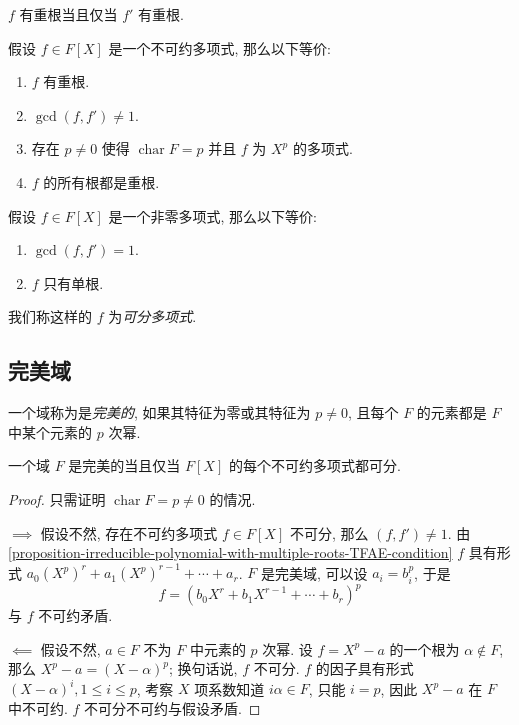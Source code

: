 \begin{lemma}
  \( f \) 有重根当且仅当 \( f' \) 有重根.
\end{lemma}

\begin{proposition}
  \label{proposition-irreducible-polynomial-with-multiple-roots-TFAE-condition}
  假设 \( f \in F[X] \) 是一个不可约多项式, 那么以下等价:
  \begin{enumerate}
    \item \( f \) 有重根.
    \item \( \gcd(f, f') \neq 1 \).
    \item 存在 \( p \neq 0 \) 使得 \( \operatorname{char} F = p \) 并且 \( f \)
      为 \( X^p \) 的多项式.
    \item \( f \) 的所有根都是重根.
  \end{enumerate}
\end{proposition}

\begin{proposition}
  假设 \( f \in F[X] \) 是一个非零多项式, 那么以下等价:
  \begin{enumerate}
    \item \( \gcd(f, f') = 1 \).
    \item \( f \) 只有单根.
  \end{enumerate}
  我们称这样的 \( f \) 为\emph{可分多项式}.
\end{proposition}

\subsection{完美域}

一个域称为是\emph{完美的}, 如果其特征为零或其特征为 \( p \neq 0 \), 且每个 \( F
\) 的元素都是 \( F \) 中某个元素的 \( p \) 次幂.

\begin{proposition}
  一个域 \( F \) 是完美的当且仅当 \( F[X] \) 的每个不可约多项式都可分.
\end{proposition}
\begin{proof}
  只需证明 \( \operatorname{char} F = p \neq 0 \) 的情况.

  \( \implies \) 假设不然, 存在不可约多项式 \( f \in F[X] \) 不可分, 那么 \( (f,
  f') \neq 1 \).
  由\cref{proposition-irreducible-polynomial-with-multiple-roots-TFAE-condition}
  \( f \) 具有形式 \( a_0(X^p)^r + a_{1}(X^p)^{r - 1} + \cdots + a_r \).
  \( F \) 是完美域, 可以设 \( a_i = b_i^p \), 于是
  \[
    f = (b_0 X^r + b_1 X^{r - 1} + \cdots + b_r)^p
  \]
  与 \( f \) 不可约矛盾.

  \( \impliedby \) 假设不然, \( a \in F \) 不为 \( F \) 中元素的 \( p \) 次幂.
  设 \( f =  X^p - a \) 的一个根为 \( \alpha \notin F \), 那么 \( X^p - a = (X -
  \alpha)^p \);
  换句话说, \( f \) 不可分.
  \( f \) 的因子具有形式 \( (X - \alpha)^i, 1 \leq i \leq p \), 考察 \( X \)
  项系数知道 \( i\alpha \in F \), 只能 \( i = p \), 因此 \( X^p - a \) 在 \( F
  \) 中不可约.
  \( f \) 不可分不可约与假设矛盾.
\end{proof}

